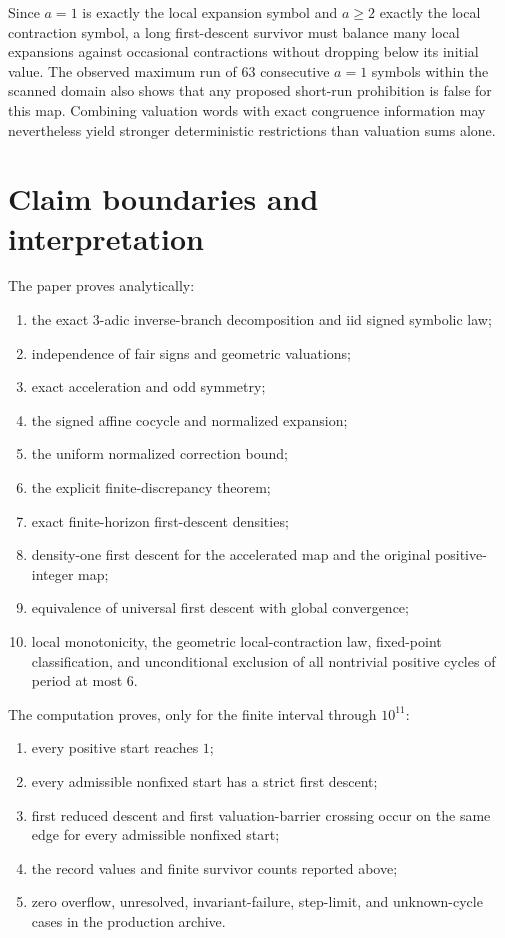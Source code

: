 \documentclass[11pt]{article}
\theoremstyle{definition}
\theoremstyle{remark}
\begin{document}
Since $a=1$ is exactly the local expansion symbol and $a\ge2$ exactly the local contraction symbol, a long first-descent survivor must balance many local expansions against occasional contractions without dropping below its initial value.  The observed maximum run of $63$ consecutive $a=1$ symbols within the scanned domain also shows that any proposed short-run prohibition is false for this map.  Combining valuation words with exact congruence information may nevertheless yield stronger deterministic restrictions than valuation sums alone.

\section{Claim boundaries and interpretation}

The paper proves analytically:
\begin{enumerate}[leftmargin=2.2em]
\item the exact $3$-adic inverse-branch decomposition and iid signed symbolic law;
\item independence of fair signs and geometric valuations;
\item exact acceleration and odd symmetry;
\item the signed affine cocycle and normalized expansion;
\item the uniform normalized correction bound;
\item the explicit finite-discrepancy theorem;
\item exact finite-horizon first-descent densities;
\item density-one first descent for the accelerated map and the original positive-integer map;
\item equivalence of universal first descent with global convergence;
\item local monotonicity, the geometric local-contraction law, fixed-point classification, and unconditional exclusion of all nontrivial positive cycles of period at most $6$.
\end{enumerate}

The computation proves, only for the finite interval through $10^{11}$:
\begin{enumerate}[leftmargin=2.2em]
\item every positive start reaches $1$;
\item every admissible nonfixed start has a strict first descent;
\item first reduced descent and first valuation-barrier crossing occur on the same edge for every admissible nonfixed start;
\item the record values and finite survivor counts reported above;
\item zero overflow, unresolved, invariant-failure, step-limit, and unknown-cycle cases in the production archive.
\end{enumerate}
\end{document}
